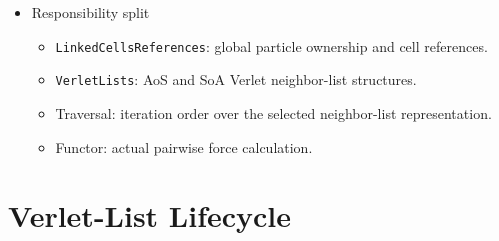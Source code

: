 \begin{itemize}
    \item Responsibility split
    \begin{itemize}
        \item \texttt{LinkedCellsReferences}: global particle ownership and cell references.
        \item \texttt{VerletLists}: AoS and SoA Verlet neighbor-list structures.
        \item Traversal: iteration order over the selected neighbor-list representation.
        \item Functor: actual pairwise force calculation.
    \end{itemize}
\end{itemize}

\section{Verlet-List Lifecycle}
\label{sec:baseline_verlet_lifecycle}

